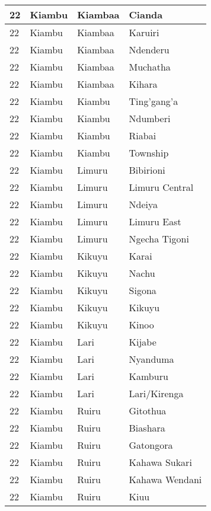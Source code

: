 \begin{table}[!ht]
\begin{tabular}{|l|l|l|l|}
        22 & Kiambu & Kiambaa & Cianda \\ \hline
        22 & Kiambu & Kiambaa & Karuiri \\ \hline
        22 & Kiambu & Kiambaa & Ndenderu \\ \hline
        22 & Kiambu & Kiambaa & Muchatha \\ \hline
        22 & Kiambu & Kiambaa & Kihara \\ \hline
        22 & Kiambu & Kiambu & Ting’gang’a \\ \hline
        22 & Kiambu & Kiambu & Ndumberi \\ \hline
        22 & Kiambu & Kiambu & Riabai \\ \hline
        22 & Kiambu & Kiambu & Township \\ \hline
        22 & Kiambu & Limuru & Bibirioni \\ \hline
        22 & Kiambu & Limuru & Limuru Central \\ \hline
        22 & Kiambu & Limuru & Ndeiya \\ \hline
        22 & Kiambu & Limuru & Limuru East \\ \hline
        22 & Kiambu & Limuru & Ngecha Tigoni \\ \hline
        22 & Kiambu & Kikuyu & Karai \\ \hline
        22 & Kiambu & Kikuyu & Nachu \\ \hline
        22 & Kiambu & Kikuyu & Sigona \\ \hline
        22 & Kiambu & Kikuyu & Kikuyu \\ \hline
        22 & Kiambu & Kikuyu & Kinoo \\ \hline
        22 & Kiambu & Lari & Kijabe \\ \hline
        22 & Kiambu & Lari & Nyanduma \\ \hline
        22 & Kiambu & Lari & Kamburu \\ \hline
        22 & Kiambu & Lari & Lari/Kirenga \\ \hline
        22 & Kiambu & Ruiru & Gitothua \\ \hline
        22 & Kiambu & Ruiru & Biashara \\ \hline
        22 & Kiambu & Ruiru & Gatongora \\ \hline
        22 & Kiambu & Ruiru & Kahawa Sukari \\ \hline
        22 & Kiambu & Ruiru & Kahawa Wendani \\ \hline
        22 & Kiambu & Ruiru & Kiuu \\ \hline

\end{tabular}
\end{table}
